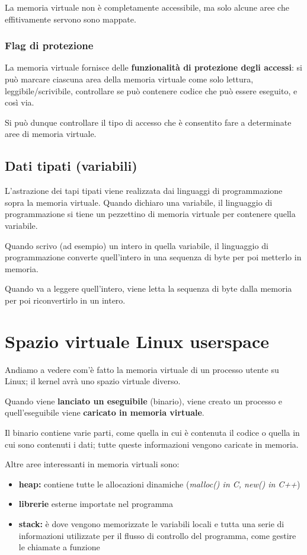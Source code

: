La memoria virtuale non è completamente accessibile, ma solo alcune aree che
effitivamente servono sono mappate.

\subsubsection{Flag di protezione}

La memoria virtuale fornisce delle \textbf{funzionalità di protezione degli accessi}:
si può marcare ciascuna area della memoria virtuale come solo lettura, leggibile/scrivibile, controllare se può contenere codice che può essere eseguito, e così via.

Si può dunque controllare il tipo di accesso che è consentito fare a determinate aree di memoria virtuale.

\subsection{Dati tipati (variabili)}

L'astrazione dei tapi tipati viene realizzata dai linguaggi di programmazione
sopra la memoria virtuale.
Quando dichiaro una variabile, il linguaggio di programmazione si tiene un pezzettino di memoria virtuale per contenere quella variabile.

Quando scrivo (ad esempio) un intero in quella variabile, il linguaggio di programmazione converte quell'intero
in una sequenza di byte per poi metterlo in memoria.

Quando va a leggere quell'intero, viene letta la sequenza di byte dalla memoria per poi riconvertirlo in un intero.

\section{Spazio virtuale Linux userspace}

Andiamo a vedere com'è fatto la memoria virtuale di un processo 
utente su Linux; il kernel avrà uno spazio virtuale diverso.

Quando viene \textbf{lanciato un eseguibile} (binario), viene creato un processo e quell'eseguibile viene
\textbf{caricato in memoria virtuale}.

Il binario contiene varie parti, come quella in cui è contenuta il codice o quella in cui sono contenuti i dati;
tutte queste informazioni vengono caricate in memoria.

Altre aree interessanti in memoria virtuali sono:
\begin{itemize}
    \item \textbf{heap:} contiene tutte le allocazioni dinamiche (\textit{malloc() in C, new() in C++})
    \item \textbf{librerie} esterne importate nel programma
    \item \textbf{stack:} è dove vengono memorizzate le variabili locali e tutta una serie di informazioni
    utilizzate per il flusso di controllo del programma, come gestire le chiamate a funzione
\end{itemize}

